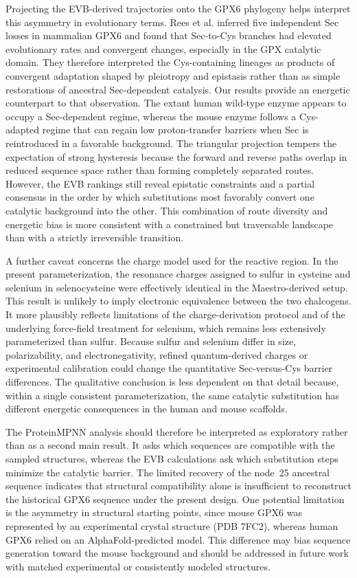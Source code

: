 Projecting the EVB-derived trajectories onto the GPX6 phylogeny helps interpret this asymmetry in evolutionary terms. Rees et al. inferred five independent Sec losses in mammalian GPX6 and found that Sec-to-Cys branches had elevated evolutionary rates and convergent changes, especially in the GPX catalytic domain.\cite{rees_ancient_2024} They therefore interpreted the Cys-containing lineages as products of convergent adaptation shaped by pleiotropy and epistasis rather than as simple restorations of ancestral Sec-dependent catalysis. Our results provide an energetic counterpart to that observation. The extant human wild-type enzyme appears to occupy a Sec-dependent regime, whereas the mouse enzyme follows a Cys-adapted regime that can regain low proton-transfer barriers when Sec is reintroduced in a favorable background. The triangular projection tempers the expectation of strong hysteresis because the forward and reverse paths overlap in reduced sequence space rather than forming completely separated routes. However, the EVB rankings still reveal epistatic constraints and a partial consensus in the order by which substitutions most favorably convert one catalytic background into the other. This combination of route diversity and energetic bias is more consistent with a constrained but traversable landscape than with a strictly irreversible transition.

A further caveat concerns the charge model used for the reactive region. In the present parameterization, the resonance charges assigned to sulfur in cysteine and selenium in selenocysteine were effectively identical in the Maestro-derived setup. This result is unlikely to imply electronic equivalence between the two chalcogens. It more plausibly reflects limitations of the charge-derivation protocol and of the underlying force-field treatment for selenium, which remains less extensively parameterized than sulfur. Because sulfur and selenium differ in size, polarizability, and electronegativity, refined quantum-derived charges or experimental calibration could change the quantitative Sec-versus-Cys barrier differences. The qualitative conclusion is less dependent on that detail because, within a single consistent parameterization, the same catalytic substitution has different energetic consequences in the human and mouse scaffolds.

The ProteinMPNN analysis should therefore be interpreted as exploratory rather than as a second main result. It asks which sequences are compatible with the sampled structures, whereas the EVB calculations ask which substitution steps minimize the catalytic barrier. The limited recovery of the node~25 ancestral sequence indicates that structural compatibility alone is insufficient to reconstruct the historical GPX6 sequence under the present design. One potential limitation is the asymmetry in structural starting points, since mouse GPX6 was represented by an experimental crystal structure (PDB 7FC2), whereas human GPX6 relied on an AlphaFold-predicted model. This difference may bias sequence generation toward the mouse background and should be addressed in future work with matched experimental or consistently modeled structures.

